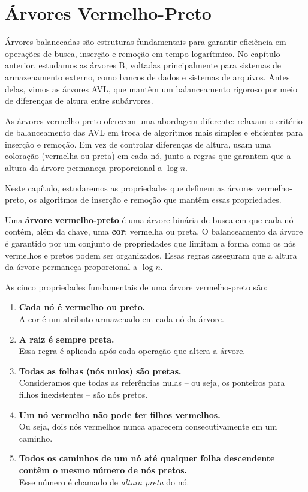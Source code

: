 \chapter{Árvores Vermelho-Preto}

Árvores balanceadas são estruturas fundamentais para garantir eficiência em operações de busca, inserção e remoção em tempo logarítmico. 
No capítulo anterior, estudamos as árvores B, voltadas principalmente para sistemas de armazenamento externo, como bancos de dados e sistemas de arquivos. 
Antes delas, vimos as árvores AVL, que mantêm um balanceamento rigoroso por meio de diferenças de altura entre subárvores.

As árvores vermelho-preto oferecem uma abordagem diferente: relaxam o critério de balanceamento das AVL em troca de algoritmos mais simples e eficientes para inserção e remoção. 
Em vez de controlar diferenças de altura, usam uma coloração (vermelha ou preta) em cada nó, junto a regras que garantem que a altura da árvore permaneça proporcional a $\log n$. 

Neste capítulo, estudaremos as propriedades que definem as árvores vermelho-preto, os algoritmos de inserção e remoção que mantêm essas propriedades.

Uma \textbf{árvore vermelho-preto} é uma árvore binária de busca em que cada nó contém, além da chave, uma \textbf{cor}: vermelha ou preta. 
O balanceamento da árvore é garantido por um conjunto de propriedades que limitam a forma como os nós vermelhos e pretos podem ser organizados. 
Essas regras asseguram que a altura da árvore permaneça proporcional a $\log n$.

As cinco propriedades fundamentais de uma árvore vermelho-preto são:

\begin{enumerate}
    \item \textbf{Cada nó é vermelho ou preto.} \\
    A cor é um atributo armazenado em cada nó da árvore.

    \item \textbf{A raiz é sempre preta.} \\
    Essa regra é aplicada após cada operação que altera a árvore.

    \item \textbf{Todas as folhas (nós nulos) são pretas.} \\
    Consideramos que todas as referências nulas -- ou seja, os ponteiros para filhos inexistentes -- são nós pretos.

    \item \textbf{Um nó vermelho não pode ter filhos vermelhos.} \\
    Ou seja, dois nós vermelhos nunca aparecem consecutivamente em um caminho.

    \item \textbf{Todos os caminhos de um nó até qualquer folha descendente contêm o mesmo número de nós pretos.} \\
    Esse número é chamado de \textit{altura preta} do nó.
\end{enumerate}

